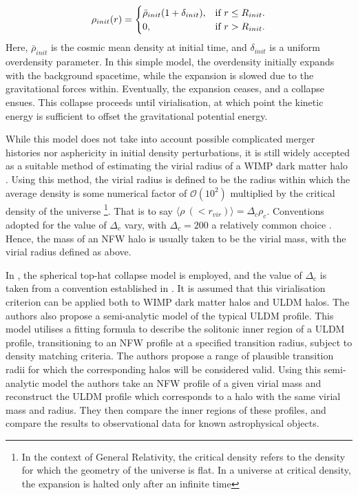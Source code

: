 \begin{equation}
    \rho_{init}(r) = \begin{cases}
    \Bar{\rho}_{init}(1+\delta_{init}), & \text{if $r\leq R_{init}$}.\\
    0, & \text{if $r>R_{init}$}.
  \end{cases}
\end{equation}
Here, $\bar{\rho}_{init}$ is the cosmic mean density at initial time, and $\delta_{init}$ is a uniform overdensity parameter. In this simple model, the overdensity initially expands with the background spacetime, while the expansion is slowed due to the gravitational forces within. Eventually, the expansion ceases, and a collapse ensues. This collapse proceeds until virialisation, at which point the kinetic energy is sufficient to offset the gravitational potential energy. 

While this model does not take into account possible complicated merger histories nor asphericity in initial density perturbations, it is still widely accepted as a suitable method of estimating the virial radius of a WIMP dark matter halo \cite{Suto:2015jdt, 2010arXiv1005.0411C}. Using this method, the virial radius is defined to be the radius within which the average density is some numerical factor of $\mathcal{O}(10^2)$ multiplied by the critical density of the universe \footnote{In the context of General Relativity, the critical density refers to the density for which the geometry of the universe is flat. In a universe at critical density, the expansion is halted only after an infinite time}. That is to say $\langle \rho\ (<r_{vir})\rangle = \Delta_c\rho_c$. Conventions adopted for the value of $\Delta_c$ vary, with $\Delta_c=200$ a relatively common choice \cite{Zemp:2013bga}. Hence, the mass of an NFW halo is usually taken to be the virial mass, with the virial radius defined as above.

In \cite{Robles:2018fur}, the spherical top-hat collapse model is employed, and the value of $\Delta_c$ is taken from a convention established in \cite{Bryan:1997dn}. It is assumed that this virialisation criterion can be applied both to WIMP dark matter halos and ULDM halos. The authors also propose a semi-analytic model of the typical ULDM profile. This model utilises a fitting formula to describe the solitonic inner region of a ULDM profile, transitioning to an NFW profile at a specified transition radius, subject to density matching criteria. The authors propose a range of plausible transition radii for which the corresponding halos will be considered valid. Using this semi-analytic model the authors take an NFW profile of a given virial mass and reconstruct the ULDM profile which corresponds to a halo with the same virial mass and radius. They then compare the inner regions of these profiles, and compare the results to observational data for known astrophysical objects. 

